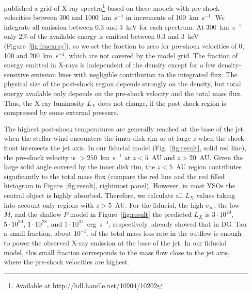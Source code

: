 \citet{2011AN....332..448G} published a grid of X-ray spectra\footnote{Available at http://hdl.handle.net/10904/10202} based on these models with pre-shock velocities between 300 and 1000~km~s$^{-1}$ in increments of 100~km~s$^{-1}$. We integrate all emission between 0.3 and 3~keV for each spectrum. At 300~km~s$^{-1}$ only 2\% of the available energy is emitted between 0.3 and 3~keV (Figure~\ref{fig:fracxray}), so we set the fraction to zero for pre-shock velocities of 0, 100 and 200~km~s$^{-1}$, which are not covered by the model grid. The fraction of energy emitted in X-rays is independent of the density except for a few density-sensitive emission lines with negligible contribution to the integrated flux. The physical size of the post-shock region depends strongly on the density, but total energy available only depends on the pre-shock velocity and the total mass flux. Thus, the X-ray luminosity $L_X$ does not change, if the post-shock region is compressed by some external pressure.

The highest post-shock temperatures are generally reached at the base of the jet when the stellar wind encounters the inner disk rim or at large $z$ when the shock front intersects the jet axis. In our fiducial model (Fig.~\ref{fig:result}, solid red line), the pre-shock velocity is $>250$~km~s$^{-1}$ at $z<5$~AU and $z>20$~AU. Given the large solid angle covered by the inner disk rim, the  $z<5$~AU region contributes significantly to the total mass flux (compare the red line and the red filled histogram in Figure~\ref{fig:result}, rightmost panel). However, in most YSOs the central object is highly absorbed. Therefore, we calculate all $L_X$ values taking into account only regions with  $z>5$~AU. For the fiducial, the high $v_\infty$, the low $\dot M$, and the shallow $P$ model in Figure~\ref{fig:result} the predicted $L_X$ is $3\cdot10^{29}$, $5\cdot10^{30}$, $1\cdot10^{28}$, and $1\cdot10^{31}$~erg~s$^{-1}$, respectively.
\citet{2009A&A...493..579G} already showed that in DG~Tau a small fraction, about $10^{-3}$, of the total mass loss rate in the outflow is enough to power the observed X-ray emission at the base of the jet. In our fiducial model, this small fraction corresponds to the mass flow close to the jet axis, where the pre-shock velocities are highest.

